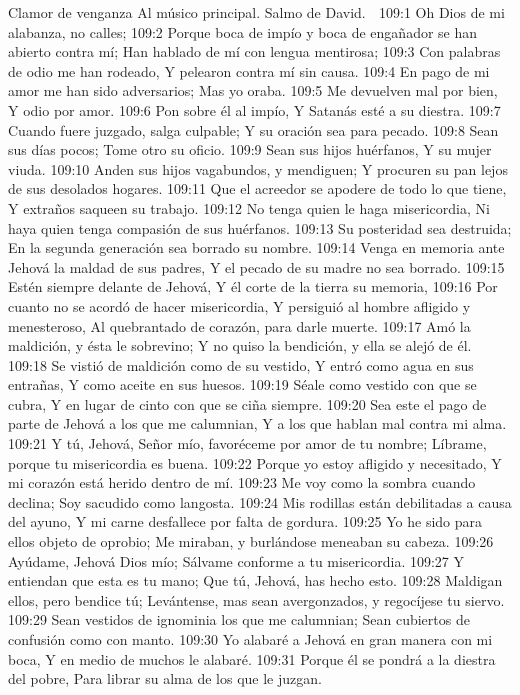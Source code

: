 Clamor de venganza 
Al músico principal. Salmo de David. 

109:1 Oh Dios de mi alabanza, no calles; 
109:2 Porque boca de impío y boca de engañador se han abierto contra mí; 
Han hablado de mí con lengua mentirosa; 
109:3 Con palabras de odio me han rodeado, 
Y pelearon contra mí sin causa. 
109:4 En pago de mi amor me han sido adversarios; 
Mas yo oraba. 
109:5 Me devuelven mal por bien, 
Y odio por amor. 
109:6 Pon sobre él al impío, 
Y Satanás esté a su diestra. 
109:7 Cuando fuere juzgado, salga culpable; 
Y su oración sea para pecado. 
109:8 Sean sus días pocos; 
Tome otro su oficio. 
109:9 Sean sus hijos huérfanos, 
Y su mujer viuda. 
109:10 Anden sus hijos vagabundos, y mendiguen; 
Y procuren su pan lejos de sus desolados hogares. 
109:11 Que el acreedor se apodere de todo lo que tiene, 
Y extraños saqueen su trabajo. 
109:12 No tenga quien le haga misericordia, 
Ni haya quien tenga compasión de sus huérfanos. 
109:13 Su posteridad sea destruida; 
En la segunda generación sea borrado su nombre. 
109:14 Venga en memoria ante Jehová la maldad de sus padres, 
Y el pecado de su madre no sea borrado. 
109:15 Estén siempre delante de Jehová, 
Y él corte de la tierra su memoria, 
109:16 Por cuanto no se acordó de hacer misericordia, 
Y persiguió al hombre afligido y menesteroso, 
Al quebrantado de corazón, para darle muerte. 
109:17 Amó la maldición, y ésta le sobrevino; 
Y no quiso la bendición, y ella se alejó de él. 
109:18 Se vistió de maldición como de su vestido, 
Y entró como agua en sus entrañas, 
Y como aceite en sus huesos. 
109:19 Séale como vestido con que se cubra, 
Y en lugar de cinto con que se ciña siempre. 
109:20 Sea este el pago de parte de Jehová a los que me calumnian, 
Y a los que hablan mal contra mi alma. 
109:21 Y tú, Jehová, Señor mío, favoréceme por amor de tu nombre; 
Líbrame, porque tu misericordia es buena. 
109:22 Porque yo estoy afligido y necesitado, 
Y mi corazón está herido dentro de mí. 
109:23 Me voy como la sombra cuando declina; 
Soy sacudido como langosta. 
109:24 Mis rodillas están debilitadas a causa del ayuno, 
Y mi carne desfallece por falta de gordura. 
109:25 Yo he sido para ellos objeto de oprobio; 
Me miraban, y burlándose meneaban su cabeza. 
109:26 Ayúdame, Jehová Dios mío; 
Sálvame conforme a tu misericordia. 
109:27 Y entiendan que esta es tu mano; 
Que tú, Jehová, has hecho esto. 
109:28 Maldigan ellos, pero bendice tú; 
Levántense, mas sean avergonzados, y regocíjese tu siervo. 
109:29 Sean vestidos de ignominia los que me calumnian; 
Sean cubiertos de confusión como con manto. 
109:30 Yo alabaré a Jehová en gran manera con mi boca, 
Y en medio de muchos le alabaré. 
109:31 Porque él se pondrá a la diestra del pobre, 
Para librar su alma de los que le juzgan. 

